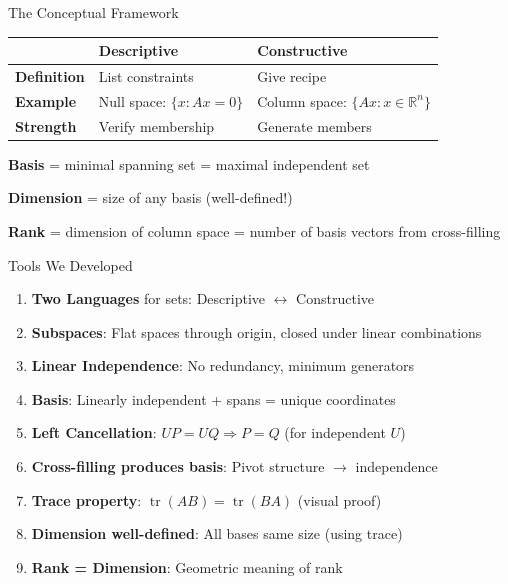 \documentclass[10pt]{beamer}
\theoremstyle{definition}
\newcommand{\x}[1]{\alert{\textbf{#1}}}
\begin{document}
\begin{frame}{The Conceptual Framework}
\begin{center}
\begin{tabular}{|l|p{3.5cm}|p{3.5cm}|}
\hline
& \textbf{Descriptive} & \textbf{Constructive} \\
\hline
\textbf{Definition} & List constraints & Give recipe \\
\hline
\textbf{Example} & Null space: $\{x : Ax=0\}$ & Column space: $\{Ax : x \in \mathbb{R}^n\}$ \\
\hline
\textbf{Strength} & Verify membership & Generate members \\
\hline
\end{tabular}
\end{center}

\vfill
\x{Basis} = minimal spanning set = maximal independent set

\vfill
\x{Dimension} = size of any basis (well-defined!)

\vfill
\x{Rank} = dimension of column space = number of basis vectors from cross-filling
\end{frame}

\begin{frame}{Tools We Developed}
\begin{enumerate}
\item \x{Two Languages} for sets: Descriptive $\leftrightarrow$ Constructive
\item \x{Subspaces}: Flat spaces through origin, closed under linear combinations
\item \x{Linear Independence}: No redundancy, minimum generators
\item \x{Basis}: Linearly independent + spans = unique coordinates
\item \x{Left Cancellation}: $UP = UQ \Rightarrow P = Q$ (for independent $U$)
\item \x{Cross-filling produces basis}: Pivot structure $\to$ independence
\item \x{Trace property}: $\operatorname{tr}(AB) = \operatorname{tr}(BA)$ (visual proof)
\item \x{Dimension well-defined}: All bases same size (using trace)
\item \x{Rank = Dimension}: Geometric meaning of rank
\end{enumerate}
\end{frame}
\end{document}
